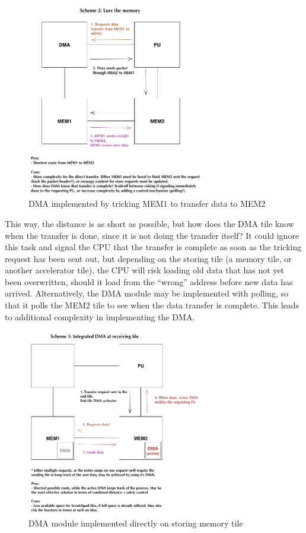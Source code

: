 \begin{figure}[h!]
    \centering
    \includegraphics[width=0.7\textwidth]{Figures/DMA/DMASHMAC2}
    \caption{DMA implemented by tricking MEM1 to transfer data to MEM2}
    \label{fig:DMASHMAC2}
\end{figure}
 
This way, the distance is as short as possible, but how does the DMA tile know when the transfer is done, since it is not doing the transfer itself?
It could ignore this task and signal the CPU that the transfer is complete as soon as the tricking request has been sent out, but depending on the storing tile (a memory tile, or another accelerator tile), the CPU will risk loading old data that has not yet been overwritten, should it load from the ``wrong'' address before new data has arrived.
Alternatively, the DMA module may be implemented with polling, so that it polls the MEM2 tile to see when the data transfer is complete.
This leads to additional complexity in implementing the DMA.
 
\begin{figure}[h!]
    \centering
    \includegraphics[width=0.7\textwidth]{Figures/DMA/DMASHMAC3}
    \caption{DMA module implemented directly on storing memory tile}
    \label{fig:DMASHMAC3}
\end{figure}
 

